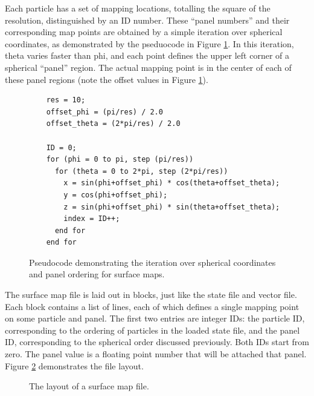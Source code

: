 Each particle has a set of mapping locations, totalling the square of the resolution, distinguished by an ID number.  These ``panel numbers'' and their corresponding map points are obtained by a simple iteration over spherical coordinates, as demonstrated by the pseduocode in Figure \ref{panel-nums}.  In this iteration, theta varies faster than phi, and each point defines the upper left corner of a spherical ``panel'' region.  The actual mapping point is in the center of each of these panel regions (note the offset values in Figure \ref{panel-nums}).

\begin{figure}
\centering
\begin{verbatim}
	res = 10;	
	offset_phi = (pi/res) / 2.0
	offset_theta = (2*pi/res) / 2.0
	
	ID = 0;
	for (phi = 0 to pi, step (pi/res))
	  for (theta = 0 to 2*pi, step (2*pi/res))
	    x = sin(phi+offset_phi) * cos(theta+offset_theta);
	    y = cos(phi+offset_phi);
	    z = sin(phi+offset_phi) * sin(theta+offset_theta);
	    index = ID++;
	  end for
	end for
\end{verbatim}
\caption[Pseudocode demonstrating the panel ordering]{Pseudocode demonstrating the iteration over spherical coordinates and panel ordering for surface maps.}
\label{panel-nums}
\end{figure}

The surface map file is laid out in blocks, just like the state file and vector file.  Each block contains a list of lines, each of which defines a single mapping point on some particle and panel.  The first two entries are integer IDs: the particle ID, corresponding to the ordering of particles in the loaded state file, and the panel ID, corresponding to the spherical order discussed previously.  Both IDs start from zero.  The panel value is a floating point number that will be attached that panel.  Figure \ref{surface-layout} demonstrates the file layout.

\begin{figure}[htbp]
\centering
{}
\caption[The layout of a surface map file]{The layout of a surface map file.}
\label{surface-layout}
\end{figure}

